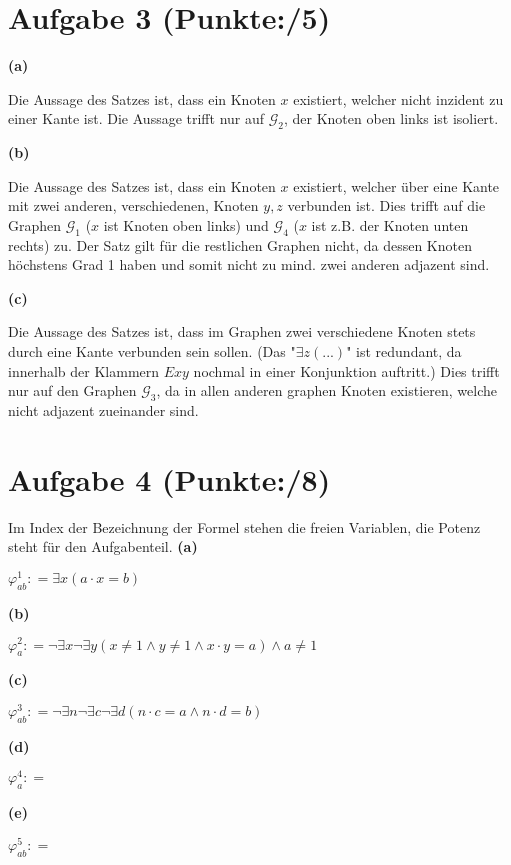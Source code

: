 \documentclass[11pt, a4paper]{article}
\newcommand{\pp}{5}
\newcommand{\ppp}{8}
\newcommand{\defgr}{\mathrel{\mathop:\!\!=}}
\begin{document}
\section*{Aufgabe 3 (Punkte:\qquad/\pp)}
\textbf{(a)}
\begin{adjustwidth}{20pt}{20pt}
	Die Aussage des Satzes ist, dass ein Knoten $x$ existiert, welcher nicht inzident zu einer Kante ist. Die Aussage trifft nur auf $\mathcal{G}_2$, der Knoten oben links ist isoliert.
\end{adjustwidth}
\textbf{(b)}
\begin{adjustwidth}{20pt}{20pt}
	Die Aussage des Satzes ist, dass ein Knoten $x$ existiert, welcher über eine Kante mit zwei anderen, verschiedenen, Knoten $y,z$ verbunden ist. Dies trifft auf die Graphen
	 $\mathcal{G}_1$ ($x$ ist Knoten oben links) und  $\mathcal{G}_4$ ($x$ ist z.B. der Knoten unten rechts) zu. Der Satz gilt für die restlichen Graphen nicht, da dessen Knoten
	höchstens Grad 1 haben und somit nicht zu mind. zwei anderen adjazent sind.
\end{adjustwidth}
\textbf{(c)}
\begin{adjustwidth}{20pt}{20pt}
	Die Aussage des Satzes ist, dass im Graphen zwei verschiedene Knoten stets durch eine Kante verbunden sein sollen. (Das "$\exists z(...)$" ist redundant, da innerhalb der Klammern
	$Exy$ nochmal in einer Konjunktion auftritt.) Dies trifft nur auf den Graphen  $\mathcal{G}_3$, da in allen anderen graphen Knoten existieren, welche nicht adjazent zueinander sind.
\end{adjustwidth}



\section*{Aufgabe 4 (Punkte:\qquad/\ppp)}
Im Index der Bezeichnung der Formel stehen die freien Variablen, die Potenz steht für den Aufgabenteil.\newpage
\noindent\textbf{(a)}
\begin{adjustwidth}{20pt}{20pt}
	$\varphi_{ab}^1 \defgr \exists x(a \cdot x = b)$
\end{adjustwidth}
\textbf{(b)}
\begin{adjustwidth}{20pt}{20pt}
	$\varphi_a^2 \defgr \neg\exists x \neg\exists y(x \neq 1 \wedge y \neq 1 \wedge x \cdot y = a) \wedge a \neq 1$
\end{adjustwidth}
\textbf{(c)}
\begin{adjustwidth}{20pt}{20pt}
	$\varphi_{ab}^3 \defgr \neg\exists n \neg\exists c \neg\exists d(n \cdot c = a \wedge n \cdot d = b)$
\end{adjustwidth}
\textbf{(d)}
\begin{adjustwidth}{20pt}{20pt}
	$\varphi_a^4 \defgr $
\end{adjustwidth}
\textbf{(e)}
\begin{adjustwidth}{20pt}{20pt}
	$\varphi_{ab}^5 \defgr $
\end{adjustwidth}
\end{document}
